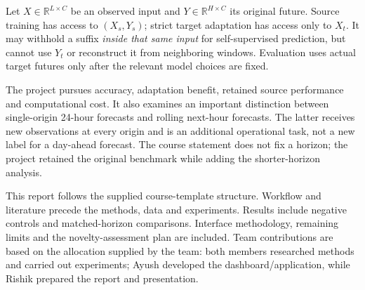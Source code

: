 Let $X\in\mathbb R^{L\times C}$ be an observed input and $Y\in\mathbb R^{H\times C}$ its original future. Source training has access to $(X_s,Y_s)$; strict target adaptation has access only to $X_t$. It may withhold a suffix \emph{inside that same input} for self-supervised prediction, but cannot use $Y_t$ or reconstruct it from neighboring windows. Evaluation uses actual target futures only after the relevant model choices are fixed.

The project pursues accuracy, adaptation benefit, retained source performance and computational cost. It also examines an important distinction between single-origin 24-hour forecasts and rolling next-hour forecasts. The latter receives new observations at every origin and is an additional operational task, not a new label for a day-ahead forecast. The course statement does not fix a horizon; the project retained the original benchmark while adding the shorter-horizon analysis.

This report follows the supplied course-template structure. Workflow and literature precede the methods, data and experiments. Results include negative controls and matched-horizon comparisons. Interface methodology, remaining limits and the novelty-assessment plan are included. Team contributions are based on the allocation supplied by the team: both members researched methods and carried out experiments; Ayush developed the dashboard/application, while Rishik prepared the report and presentation.

